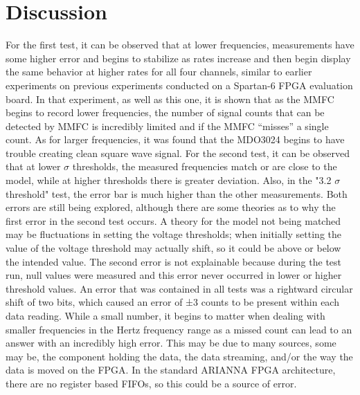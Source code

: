 \documentclass[journal]{IEEEtran}
\begin{document}
\section{Discussion}
	For the first test, it can be observed that at lower frequencies, measurements have some higher error and begins to stabilize as rates increase and then begin display the same behavior at higher rates for all four channels, similar to earlier experiments on previous experiments conducted on a Spartan-6 FPGA evaluation board.  In that experiment, as well as this one, it is shown that as the MMFC begins to record lower frequencies, the number of signal counts that can be detected by MMFC is incredibly limited and if the MMFC “misses” a single count.  As for larger frequencies, it was found that the MDO3024 begins to have trouble creating clean square wave signal. 	For the second test, it can be observed that at lower $\sigma$ thresholds, the measured frequencies match or are close to the model, while at higher thresholds there is greater deviation.  Also, in the "3.2 $\sigma$ threshold" test, the error bar is much higher than the other measurements.  Both errors are still being explored, although there are some theories as to why the first error in the second test occurs.  A theory for the model not being matched may be fluctuations in setting the voltage thresholds; when initially setting the value of the voltage threshold may actually shift, so it could be above or below the intended value.  The second error is not explainable because during the test run, null values were measured and this error never occurred in lower or higher threshold values.  An error that was contained in all tests was a rightward circular shift of two bits, which caused an error of ±3 counts to be present within each data reading.  While a small number, it begins to matter when dealing with smaller frequencies in the Hertz frequency range as a missed count can lead to an answer with an incredibly high error.  This may be due to many sources, some may be, the component holding the data, the data streaming, and/or the way the data is moved on the FPGA.  In the standard ARIANNA FPGA architecture, there are no register based FIFOs, so this could be a source of error.
\end{document}
